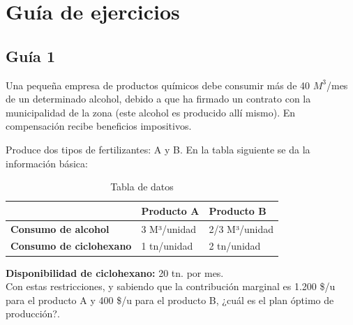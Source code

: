 \documentclass[../main.tex]{subfiles}
\begin{document}
\section{Guía de ejercicios} 
    \subsection{Guía 1}
        \begin{exercise} 
            Una pequeña empresa de productos químicos debe consumir más de 40 $M^3$/mes de un determinado alcohol, debido a que ha firmado un contrato con la municipalidad de la zona (este alcohol es producido allí mismo). En compensación recibe beneficios impositivos. 
            
            Produce dos tipos de fertilizantes: A y B. En la tabla siguiente se da la información básica:
            \begin{table}[ht]
                \centering
                \begin{tabular}{l|l|l|}
                \cline{2-3}
                                                &  \textbf{Producto A} & \textbf{Producto B} \\ \hline
                \multicolumn{1}{|l|}{\textbf{Consumo de alcohol}} & 3 M³/unidad & 2/3 M³/unidad \\ \hline
                \multicolumn{1}{|l|}{\textbf{Consumo de ciclohexano}} & 1 tn/unidad & 2 tn/unidad \\ \hline
                \end{tabular}
                \caption{Tabla de datos}
            \end{table}

            \textbf{Disponibilidad de ciclohexano:} 20 tn. por mes.\\

            Con estas restricciones, y sabiendo que la contribución marginal es 1.200 \$/u para el producto A y 400 \$/u para el producto B, ¿cuál es el plan óptimo de producción?.\\


\end{exercise}
\end{document}

